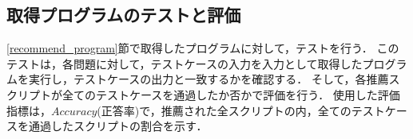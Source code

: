   \subsection{取得プログラムのテストと評価\label{test_and_evaluation}}
    \ref{recommend_program}節で取得したプログラムに対して，テストを行う．
    このテストは，各問題に対して，テストケースの入力を入力として取得したプログラムを実行し，テストケースの出力と一致するかを確認する．
    そして，各推薦スクリプトが全てのテストケースを通過したか否かで評価を行う．
    使用した評価指標は，$Accuracy$(正答率)で，推薦された全スクリプトの内，全てのテストケースを通過したスクリプトの割合を示す．


